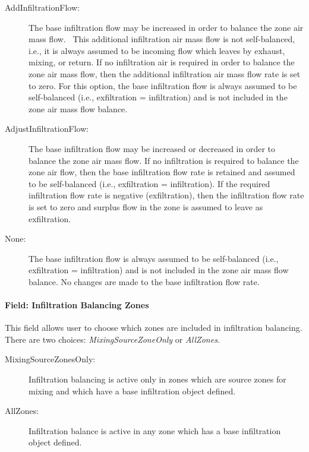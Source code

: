 \begin{description}
\item[AddInfiltrationFlow:] The base infiltration flow may be increased in order to balance the zone air mass flow.~ This additional infiltration air mass flow is not self-balanced, i.e., it is always assumed to be incoming flow which leaves by exhaust, mixing, or return. If no infiltration air is required in order to balance the zone air mass flow, then the additional infiltration air mass flow rate is set to zero. For this option, the base infiltration flow is always assumed to be self-balanced (i.e., exfiltration = infiltration) and is not included in the zone air mass flow balance.

\item[AdjustInfiltrationFlow:] The base infiltration flow may be increased or decreased in order to balance the zone air mass flow. If no infiltration is required to balance the zone air flow, then the base infiltration flow rate is retained and assumed to be self-balanced (i.e., exfiltration = infiltration). If the required infiltration flow rate is negative (exfiltration), then the infiltration flow rate is set to zero and surplus flow in the zone is assumed to leave as exfiltration.

\item[None:] The base infiltration flow is always assumed to be self-balanced (i.e., exfiltration = infiltration) and is not included in the zone air mass flow balance. No changes are made to the base infiltration flow rate.

\end{description}

\paragraph{Field: Infiltration Balancing Zones}\label{field-infiltration-balancing-zones}

This field allows user to choose which zones are included in infiltration balancing. There are two choices: \emph{MixingSourceZoneOnly} or \emph{AllZones}.

\begin{description}

\item[MixingSourceZonesOnly:] Infiltration balancing is active only in zones which are source zones for mixing and which have a base infiltration object defined.

\item[AllZones:] Infiltration balance is active in any zone which has a base infiltration object defined.

\end{description}

